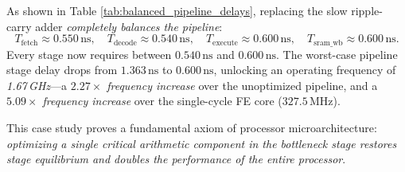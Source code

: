 \begin{table}[htbp]
\centering
\small
{}
\caption{Pipeline stage delay balancing before and after integrating the Carry Select Adder in ASAP7 7\,nm FinFET technology.}\label{tab:balanced_pipeline_delays}
\end{table}

As shown in Table \ref{tab:balanced_pipeline_delays}, replacing the slow ripple-carry adder \textit{completely balances the pipeline}:
\begin{equation}
T_{\text{fetch}} \approx 0.550\,\text{ns}, \quad T_{\text{decode}} \approx 0.540\,\text{ns}, \quad T_{\text{execute}} \approx 0.600\,\text{ns}, \quad T_{\text{sram\_wb}} \approx 0.600\,\text{ns}.
\end{equation}
Every stage now requires between $0.540\,\text{ns}$ and $0.600\,\text{ns}$. The worst-case pipeline stage delay drops from $1.363\,\text{ns}$ to $0.600\,\text{ns}$, unlocking an operating frequency of \textit{1.67\,GHz}---a \textit{$2.27\times$ frequency increase} over the unoptimized pipeline, and a \textit{$5.09\times$ frequency increase} over the single-cycle FE core ($327.5\,\text{MHz}$).

This case study proves a fundamental axiom of processor microarchitecture: \textit{optimizing a single critical arithmetic component in the bottleneck stage restores stage equilibrium and doubles the performance of the entire processor}.




